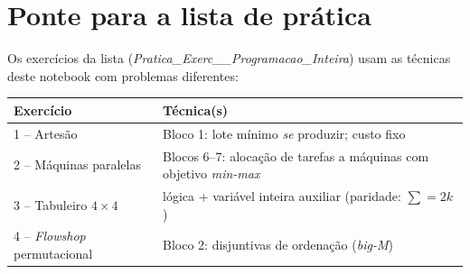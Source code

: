 \section*{Ponte para a lista de prática}
Os exercícios da lista (\emph{Pratica\_Exerc\_\_Programacao\_Inteira}) usam as técnicas deste notebook com problemas
diferentes:
\begin{center}
\begin{tabularx}{\linewidth}{lX}
\toprule
Exercício & Técnica(s)\\
\midrule
1 -- Artesão & Bloco 1: lote mínimo \emph{se} produzir; custo fixo\\
2 -- Máquinas paralelas & Blocos 6--7: alocação de tarefas a máquinas com objetivo \emph{min-max}\\
3 -- Tabuleiro $4\times4$ & lógica + variável inteira auxiliar (paridade: $\sum=2k$)\\
4 -- \emph{Flowshop} permutacional & Bloco 2: disjuntivas de ordenação (\emph{big-M})\\
\bottomrule
\end{tabularx}
\end{center}
